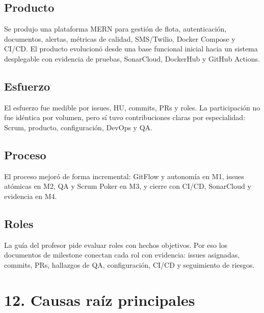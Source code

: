\documentclass[11pt,a4paper]{article}
\begin{document}
\subsection{Producto}

Se produjo una plataforma MERN para gestión de flota, autenticación, documentos, alertas, métricas de calidad, SMS/Twilio, Docker Compose y CI/CD. El producto evolucionó desde una base funcional inicial hacia un sistema desplegable con evidencia de pruebas, SonarCloud, DockerHub y GitHub Actions.

\subsection{Esfuerzo}

El esfuerzo fue medible por issues, HU, commits, PRs y roles. La participación no fue idéntica por volumen, pero sí tuvo contribuciones claras por especialidad: Scrum, producto, configuración, DevOps y QA.

\subsection{Proceso}

El proceso mejoró de forma incremental: GitFlow y autonomía en M1, issues atómicas en M2, QA y Scrum Poker en M3, y cierre con CI/CD, SonarCloud y evidencia en M4.

\subsection{Roles}

La guía del profesor pide evaluar roles con hechos objetivos. Por eso los documentos de milestone conectan cada rol con evidencia: issues asignadas, commits, PRs, hallazgos de QA, configuración, CI/CD y seguimiento de riesgos.

\section{12. Causas raíz principales}
\end{document}
